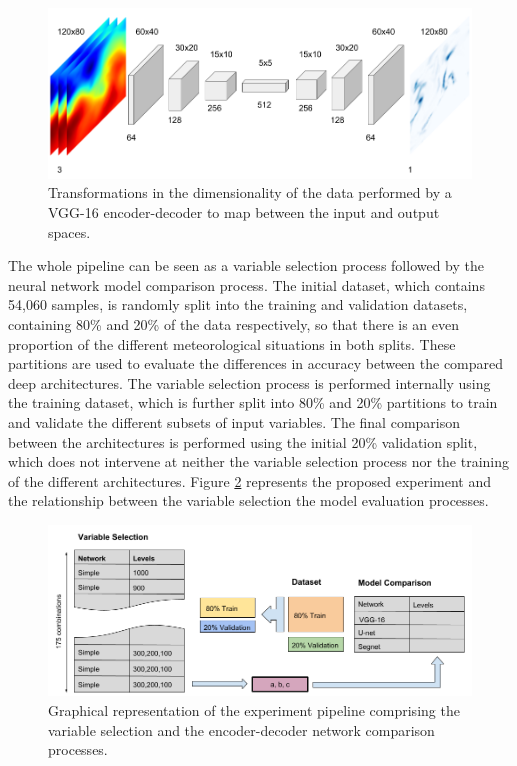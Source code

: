 \documentclass[twocol]{ametsoc}
\begin{document}
\begin{figure}[h]
 \centerline{\includegraphics[width=13cm]{vgg16_enc.png}}
  \caption{Transformations in the dimensionality of the data performed by a VGG-16 encoder-decoder to map between the input and output spaces.}\label{vgg16}
\end{figure}

The whole pipeline can be seen as a variable selection process followed by the neural network model comparison process. The initial dataset, which contains 54,060 samples, is randomly split into the training and validation datasets, containing 80\% and 20\% of the data respectively, so that there is an even proportion of the different meteorological situations in both splits. These partitions are used to evaluate the differences in accuracy between the compared deep architectures. The variable selection process is performed internally using the training dataset, which is further split into 80\% and 20\% partitions to train and validate the different subsets of input variables. The final comparison between the architectures is performed using the initial 20\% validation split, which does not intervene at neither the variable selection process nor the training of the different architectures. Figure \ref{exp} represents the proposed experiment and the relationship between the variable selection the model evaluation processes. 

\begin{figure}[h]
 \centerline{\includegraphics[width=13cm]{experiment.png}}
  \caption{Graphical representation of the experiment pipeline comprising the variable selection and the encoder-decoder network comparison processes.}\label{exp}
\end{figure}
\end{document}
